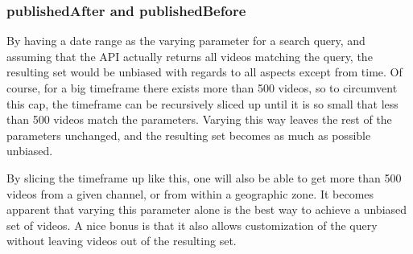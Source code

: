 \subsubsection{publishedAfter and publishedBefore}
By having a date range as the varying parameter for a search query, and assuming
that the API actually returns all videos matching the query, the resulting set
would be unbiased with regards to all aspects except from time. Of course, for
a big timeframe there exists more than 500 videos, so to circumvent this cap,
the timeframe can be recursively sliced up until it is so small that less than
500 videos match the parameters. Varying this way leaves the rest of the
parameters unchanged, and the resulting set becomes as much as possible
unbiased.

By slicing the timeframe up like this, one will also be able to get more than
500 videos from a given channel, or from within a geographic zone. It becomes
apparent that varying this parameter alone is the best way to achieve a unbiased
set of videos. A nice bonus is that it also allows customization of the query
without leaving videos out of the resulting set.

